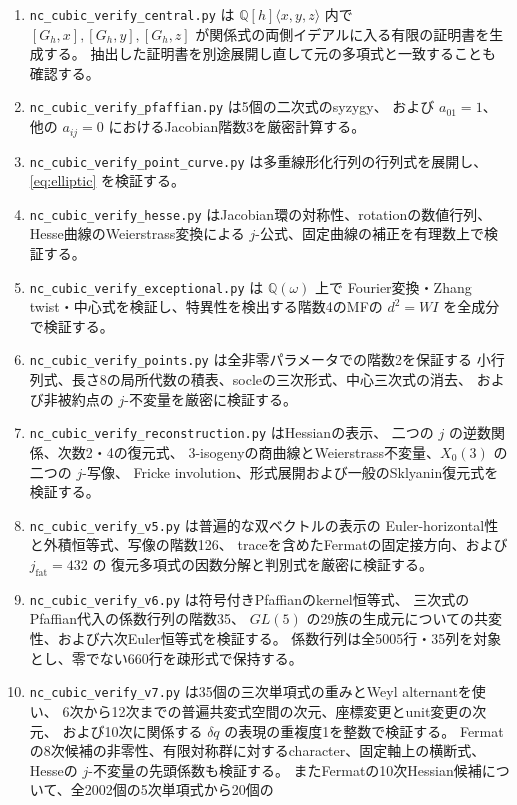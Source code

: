 \begin{enumerate}
 \item \texttt{nc\_cubic\_verify\_central.py} は $\mathbb Q[h]\langle x,y,z\rangle$ 内で
 $[G_h,x],[G_h,y],[G_h,z]$ が関係式の両側イデアルに入る有限の証明書を生成する。
 抽出した証明書を別途展開し直して元の多項式と一致することも確認する。
 \item \texttt{nc\_cubic\_verify\_pfaffian.py} は5個の二次式のsyzygy、
 および $a_{01}=1$、他の $a_{ij}=0$ におけるJacobian階数3を厳密計算する。
 \item \texttt{nc\_cubic\_verify\_point\_curve.py} は多重線形化行列の行列式を展開し、
 \eqref{eq:elliptic} を検証する。
 \item \texttt{nc\_cubic\_verify\_hesse.py} はJacobian環の対称性、rotationの数値行列、
 Hesse曲線のWeierstrass変換による $j$-公式、固定曲線の補正を有理数上で検証する。
 \item \texttt{nc\_cubic\_verify\_exceptional.py} は $\mathbb Q(\omega)$ 上で
 Fourier変換・Zhang twist・中心式を検証し、特異性を検出する階数4のMFの
 $d^2=W I$ を全成分で検証する。
 \item \texttt{nc\_cubic\_verify\_points.py} は全非零パラメータでの階数2を保証する
 小行列式、長さ8の局所代数の積表、socleの三次形式、中心三次式の消去、
 および非被約点の $j$-不変量を厳密に検証する。
 \item \texttt{nc\_cubic\_verify\_reconstruction.py} はHessianの表示、
 二つの $j$ の逆数関係、次数2・4の復元式、
 3-isogenyの商曲線とWeierstrass不変量、$X_0(3)$ の二つの $j$-写像、
 Fricke involution、形式展開および一般のSklyanin復元式を検証する。
 \item \texttt{nc\_cubic\_verify\_v5.py} は普遍的な双ベクトルの表示の
 Euler-horizontal性と外積恒等式、写像の階数126、
 traceを含めたFermatの固定接方向、および $j_{\mathrm{fat}}=432$ の
 復元多項式の因数分解と判別式を厳密に検証する。
 \item \texttt{nc\_cubic\_verify\_v6.py} は符号付きPfaffianのkernel恒等式、
 三次式のPfaffian代入の係数行列の階数35、
 $GL(5)$ の29族の生成元についての共変性、および六次Euler恒等式を検証する。
 係数行列は全5005行・35列を対象とし、零でない660行を疎形式で保持する。
 \item \texttt{nc\_cubic\_verify\_v7.py} は35個の三次単項式の重みとWeyl alternantを使い、
 6次から12次までの普遍共変式空間の次元、座標変更とunit変更の次元、
 および10次に関係する $\delta q$ の表現の重複度1を整数で検証する。
 Fermatの8次候補の非零性、有限対称群に対するcharacter、固定軸上の横断式、
 Hesseの $j$-不変量の先頭係数も検証する。
 またFermatの10次Hessian候補について、全2002個の5次単項式から20個の

\end{enumerate}

